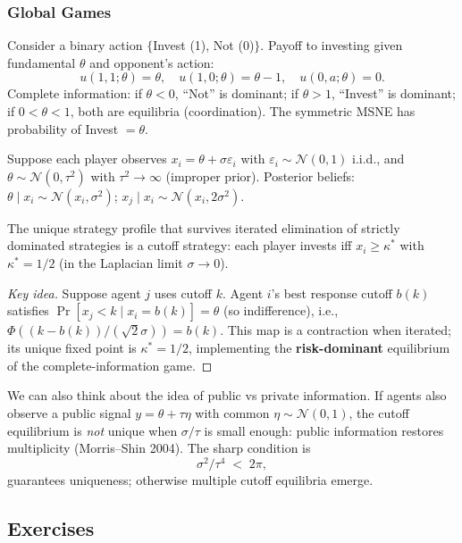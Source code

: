 \documentclass[11pt,english]{article}
\begin{document}
\subsubsection{Global Games}

Consider a binary action $\{$Invest (1), Not (0)$\}$. Payoff to investing given fundamental $\theta$ and opponent's action:$$u(1,1;\theta)=\theta,\quad u(1,0;\theta)=\theta-1,\quad u(0,a;\theta)=0.$$ Complete information: if $\theta<0$, ``Not'' is dominant; if $\theta>1$, ``Invest'' is dominant; if $0<\theta<1$, both are equilibria (coordination). The symmetric MSNE has probability of Invest $=\theta$.

Suppose each player observes $x_i=\theta+\sigma\varepsilon_i$ with $\varepsilon_i\sim\mathcal N(0,1)$ i.i.d., and $\theta\sim\mathcal N(0,\tau^2)$ with $\tau^2\to\infty$ (improper prior). Posterior beliefs: $\theta\mid x_i \sim \mathcal N(x_i, \sigma^2)$; $x_j\mid x_i\sim\mathcal N(x_i, 2\sigma^2)$.

\begin{proposition}
The unique strategy profile that survives iterated elimination of strictly dominated strategies is a cutoff strategy: each player invests iff $x_i\ge \kappa^*$ with $\kappa^*=1/2$ (in the Laplacian limit $\sigma\to 0$).
\end{proposition}

\begin{proof}[Key idea]
Suppose agent $j$ uses cutoff $k$. Agent $i$'s best response cutoff $b(k)$ satisfies $\Pr[x_j<k\mid x_i=b(k)]=\theta$ (so indifference), i.e., $\Phi((k-b(k))/(\sqrt 2 \sigma))=b(k)$. This map is a contraction when iterated; its unique fixed point is $\kappa^* =1/2$, implementing the \textbf{risk-dominant} equilibrium of the complete-information game.
\end{proof}

We can also think about the idea of public vs private information. If agents also observe a public signal $y=\theta+\tau\eta$ with common $\eta\sim\mathcal N(0,1)$, the cutoff equilibrium is \emph{not} unique when $\sigma/\tau$ is small enough: public information restores multiplicity (Morris--Shin 2004). The sharp condition is
\[
  \sigma^2/\tau^4 \;<\; 2\pi,
\]
guarantees uniqueness; otherwise multiple cutoff equilibria emerge.


\subsection{Exercises}
\end{document}
